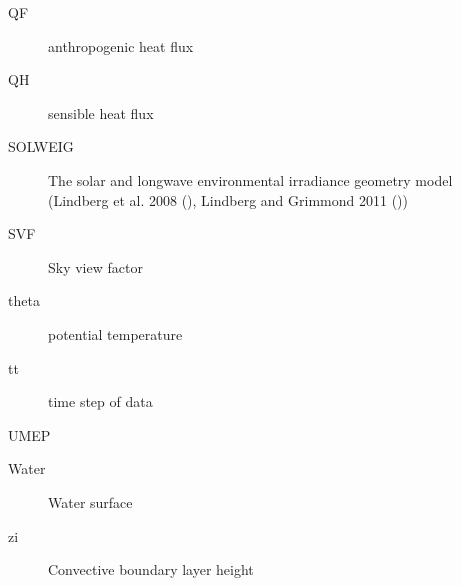 \documentclass[letterpaper,10pt,english]{sphinxmanual}
\begin{document}
\begin{description}
\item[{QF}] \leavevmode{}\label{\detokenize{notation:term-qf}}
anthropogenic  heat flux

\item[{QH}] \leavevmode{}\label{\detokenize{notation:term-qh}}
sensible heat  flux

\item[{SOLWEIG}] \leavevmode{}\label{\detokenize{notation:term-solweig}}
The solar and longwave environmental irradiance geometry model
(Lindberg et al. 2008 \label{\detokenize{notation:id8}}{\hyperref[\detokenize{references:fl2008}]{\sphinxcrossref{{[}FL2008{]}}}} (),   Lindberg and Grimmond 2011 \label{\detokenize{notation:id9}}{\hyperref[\detokenize{references:fl2011}]{\sphinxcrossref{{[}FL2011{]}}}} ())

\item[{SVF}] \leavevmode{}\label{\detokenize{notation:term-svf}}
Sky view factor

\item[{theta}] \leavevmode{}\label{\detokenize{notation:term-theta}}
potential  temperature

\item[{tt}] \leavevmode{}\label{\detokenize{notation:term-tt}}
time step of data

\item[{UMEP}] \leavevmode{}\label{\detokenize{notation:term-umep}}

\item[{Water}] \leavevmode{}\label{\detokenize{notation:term-water}}
Water surface

\item[{zi}] \leavevmode{}\label{\detokenize{notation:term-zi}}
Convective boundary layer height

\end{description}
\end{document}

